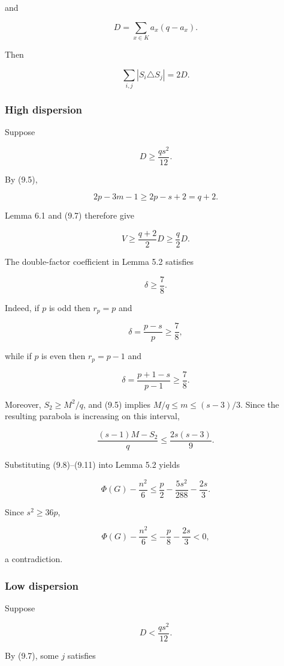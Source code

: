 \documentclass[
  11pt,
]{article}
\begin{document}
and

\[
D=\sum_{x\in K}a_x(q-a_x).
\tag{9.6}
\]

Then

\[
\sum_{i,j}|S_i\triangle S_j|=2D.
\tag{9.7}
\]

\subsubsection{High dispersion}\label{high-dispersion}

Suppose

\[
D\ge\frac{qs^2}{12}.
\tag{9.8}
\]

By (9.5),

\[
2p-3m-1\ge2p-s+2=q+2.
\]

Lemma 6.1 and (9.7) therefore give

\[
V
\ge
\frac{q+2}{2}D
\ge
\frac q2D.
\tag{9.9}
\]

The double-factor coefficient in Lemma 5.2 satisfies

\[
\boxed{\delta\ge\frac78.}
\tag{9.10}
\]

Indeed, if \(p\) is odd then \(r_p=p\) and

\[
\delta=\frac{p-s}{p}\ge\frac78,
\]

while if \(p\) is even then \(r_p=p-1\) and

\[
\delta=\frac{p+1-s}{p-1}\ge\frac78.
\]

Moreover, \(S_2\ge M^2/q\), and (9.5) implies \(M/q\le m\le(s-3)/3\). Since the resulting parabola is increasing on this interval,

\[
\frac{(s-1)M-S_2}{q}
\le
\frac{2s(s-3)}9.
\tag{9.11}
\]

Substituting (9.8)--(9.11) into Lemma 5.2 yields

\[
\Phi(G)-\frac{n^2}{6}
\le
\frac p2-\frac{5s^2}{288}-\frac{2s}{3}.
\tag{9.12}
\]

Since \(s^2\ge36p\),

\[
\Phi(G)-\frac{n^2}{6}
\le
-\frac p8-\frac{2s}{3}<0,
\]

a contradiction.

\subsubsection{Low dispersion}\label{low-dispersion}

Suppose

\[
D<\frac{qs^2}{12}.
\tag{9.13}
\]

By (9.7), some \(j\) satisfies
\end{document}
